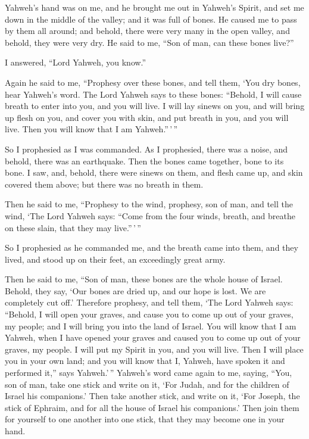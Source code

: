  Yahweh's hand was on me, and he brought me out in Yahweh's
Spirit, and set me down in the middle of the valley; and it was full of
bones.  He caused me to pass by them all around; and behold,
there were very many in the open valley, and behold, they were very dry.
 He said to me, ``Son of man, can these bones live?''

I answered, ``Lord Yahweh, you know.''

 Again he said to me, ``Prophesy over these bones, and tell
them, `You dry bones, hear Yahweh's word.  The Lord Yahweh
says to these bones: ``Behold, I will cause breath to enter into you,
and you will live.  I will lay sinews on you, and will bring
up flesh on you, and cover you with skin, and put breath in you, and you
will live. Then you will know that I am Yahweh.''\,'\,''

 So I prophesied as I was commanded. As I prophesied, there
was a noise, and behold, there was an earthquake. Then the bones came
together, bone to its bone.  I saw, and, behold, there were
sinews on them, and flesh came up, and skin covered them above; but
there was no breath in them.

 Then he said to me, ``Prophesy to the wind, prophesy, son
of man, and tell the wind, `The Lord Yahweh says: ``Come from the four
winds, breath, and breathe on these slain, that they may live.''\,'\,''

 So I prophesied as he commanded me, and the breath came
into them, and they lived, and stood up on their feet, an exceedingly
great army.

 Then he said to me, ``Son of man, these bones are the
whole house of Israel. Behold, they say, `Our bones are dried up, and
our hope is lost. We are completely cut off.'  Therefore
prophesy, and tell them, `The Lord Yahweh says: ``Behold, I will open
your graves, and cause you to come up out of your graves, my people; and
I will bring you into the land of Israel.  You will know
that I am Yahweh, when I have opened your graves and caused you to come
up out of your graves, my people.  I will put my Spirit in
you, and you will live. Then I will place you in your own land; and you
will know that I, Yahweh, have spoken it and performed it,'' says
Yahweh.'\,''  Yahweh's word came again to me, saying,
 ``You, son of man, take one stick and write on it, `For
Judah, and for the children of Israel his companions.' Then take another
stick, and write on it, `For Joseph, the stick of Ephraim, and for all
the house of Israel his companions.'  Then join them for
yourself to one another into one stick, that they may become one in your
hand.

